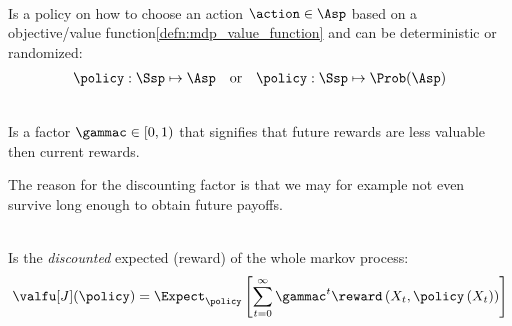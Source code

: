 \begin{defnbox}\nospacing
  \begin{defn}\label{defn:optimizing_agent_decision_maker}\leavevmode\\
    Is a policy on how to choose an action $\action\in\Asp$ based on a objective/value function\cref{defn:mdp_value_function}
    and can be deterministic or randomized:
    \begin{align}
      \policy:\Ssp\mapsto \Asp&&\text{or}&&\policy:\Ssp\mapsto\Prob(\Asp)
    \end{align}
  \end{defn}
\end{defnbox}
\begin{defnbox}\nospacing
  \begin{defn}\label{defn:mdp_discounting_factor}\leavevmode\\
    Is a factor $\gammac\in[0,1)$ that signifies that future rewards are less valuable then current rewards.
  \end{defn}
\end{defnbox}
\begin{explanationbox}
  \begin{explanation}
    The reason for the discounting factor is that we may for example not even survive long
    enough to obtain future payoffs.
  \end{explanation}
\end{explanationbox}
\begin{defnbox}\nospacing
  \begin{defn}\label{defn:expected_discounted_value}\leavevmode\\
    Is the \textit{discounted} expected (reward) of the whole markov process:
    \begin{align}
      \valfu[J](\policy)=\Expect_{\policy} \left[\sum_{t=0}^{\infty}\gammac^{t}\reward \left(X_{t},\policy\left(X_{t}\right)\right)\right]
    \end{align}
  \end{defn}
\end{defnbox}
